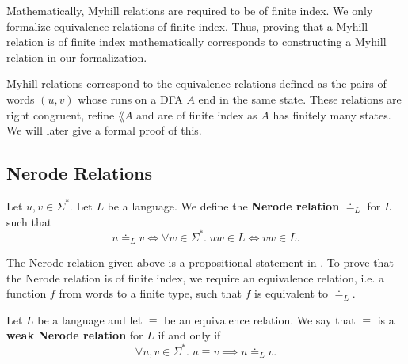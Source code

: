 Mathematically, Myhill relations are required to be of finite index. 
We only formalize equivalence relations of finite index.
Thus, proving that a Myhill relation is of finite index mathematically corresponds 
to constructing a Myhill relation in our formalization.



Myhill relations correspond to the equivalence relations 
defined as the pairs of words $(u, v)$ whose runs on a DFA $A$ end in the same state. 
These relations are right congruent, refine $\lang{A}$ and are of finite index as $A$ has finitely many states. 
We will later give a formal proof of this.

\subsection{Nerode Relations}

\begin{definition}
    \label{suffix_equal}
    Let $u, v \in \Sigma^*$. Let $L$ be a language. We define the \textbf{Nerode relation} $\doteq_L$ for $L$ such that 
    \begin{equation*}
        u \doteq_L v \iff \forall w \in \Sigma^*. \; uw \in L \Leftrightarrow vw \in L. 
    \end{equation*}
\end{definition}


The Nerode relation given above is a propositional statement in \coq. 
To prove that the Nerode relation is of finite index, 
we require an equivalence relation, 
i.e. a function $f$ from words to a finite type,
such that $f$ is equivalent to $\doteq_L$.


\begin{definition}
    \label{Weak_Nerode_Rel}
    Let $L$ be a language and let $\equiv$ be an equivalence relation. We say that $\equiv$ is a \textbf{weak Nerode relation} for $L$ if and only if
    \begin{equation*}
        \forall u, v \in \Sigma^*. \; u \equiv v \implies u \doteq_L v.
    \end{equation*}
\end{definition}


